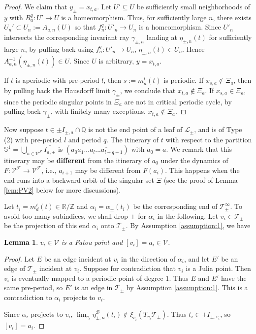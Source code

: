 \documentclass[11pt, reqno]{amsart}
\numberwithin{equation}{section}
\theoremstyle{plain}
\theoremstyle{theorem}
\newtheorem{lem}[theorem]{Lemma}
\theoremstyle{definition}
\newcommand{\R}{\mathbb{R}}
\newcommand{\Q}{\mathbb{Q}}
\newcommand{\Z}{\mathbb{Z}}
\newcommand{\RV}{\mathscr{V}}
\DeclareMathOperator{\BP}{\mathcal{B}}
\numberwithin{figure}{section}
\begin{document}
\begin{proof}
We claim that $y_\pm = x_{t,a}$. 
Let $U' \subseteq U$ be sufficiently small neighborhoods of $y$ with $R_a^{q}:U' \longrightarrow U$ is a homeomorphism.
Thus, for sufficiently large $n$, there exists $U_n' \subset U_n:= A_{a,n}(U)$ so that $f_n^{q}: U'_n \longrightarrow U_n$ is a homeomorphism.
Since $U'_n$ intersects the corresponding invariant ray $\gamma_{\pm, n}$ landing at $\eta_{\pm, n}(t)$ for sufficiently large $n$, by pulling back using $f_n^{q}: U'_n \longrightarrow U_n$, $\eta_{\pm, n}(t) \in U_n$.
Hence $A_{a,n}^{-1} (\eta_{\pm, n}(t)) \in U$.
Since $U$ is arbitrary, $y = x_{t,a}$.

If $t$ is aperiodic with pre-period $l$, then $s:=m_d^l(t)$ is periodic.
If $x_{s,a} \notin \Xi_a$, then by pulling back the Hausdorff limit $\gamma_\pm$, we conclude that $x_{t,a} \notin \Xi_a$.
If $x_{s,a} \in \Xi_a$, since the periodic singular points in $\Xi_a$ are not in critical periodic cycle, by pulling back $\gamma_\pm$, with finitely many exceptions, $x_{t,a} \notin \Xi_a$.
\end{proof}

Now suppose $t\in\pm I_{\pm, a} \cap \Q$ is not the end point of a leaf of $\mathcal{L}_\pm$, and is of Type (2) with pre-period $l$ and period $q$.
The itinerary of $t$ with respect to the partition $\mathbb{S}^1 = \bigcup_{a\in \RV^\mathcal{F}} \overline{I_{a,\pm}}$ is $(a_0 a_1... \overline{a_{l}...a_{l+q-1}})$ with $a_0 = a$.
We remark that this itinerary may be {\bf different} from the itinerary of $a_0$ under the dynamics of $F:\RV^\mathcal{F} \longrightarrow \RV^\mathcal{F}$, i.e., $a_{i+1}$ may be different from $F(a_i)$.
This happens when the end runs into a backward orbit of the singular set $\Xi$ (see the proof of Lemma \ref{lem:PV2} below for more discussions).

Let $t_i = m_d^i(t) \in \R/\Z$ and $\alpha_i = \alpha_\pm(t_i)$ be the corresponding end of $\mathcal{T}_\pm^\infty$.
To avoid too many subindices, we shall drop $\pm$ for $\alpha_i$ in the following.
Let $v_i \in \mathcal{T}_\pm$ be the projection of this end $\alpha_i$ onto $\mathcal{T}_\pm$.
By Assumption \ref{assumption:1}, we have
\begin{lem}
$v_i \in \mathcal{V}$ is a Fatou point and $[v_i] = a_i \in \RV$.
\end{lem}
\begin{proof}
Let $E$ be an edge incident at $v_i$ in the direction of $\alpha_i$, and let $E'$ be an edge of $\mathcal{T}_\pm$ incident at $v_i$.
Suppose for contradiction that $v_i$ is a Julia point. 
Then $v_i$ is eventually mapped to a periodic point of degree $1$.
Thus $E$ and $E'$ have the same pre-period, so $E'$ is an edge in $\mathcal{T}_\pm$ by Assumption \ref{assumption:1}.
This is a contradiction to $\alpha_i$ projects to $v_i$.

Since $\alpha_i$ projects to $v_i$, $\lim_{v_i} \eta_{\pm, n}^{\BP}(t_i) \notin \xi_{v_i}(T_{v_i}\mathcal{T}_\pm)$.
Thus $t_i \in \pm I_{\pm, v_i}$, so $[v_i] = a_i$.
\end{proof}
\end{document}

